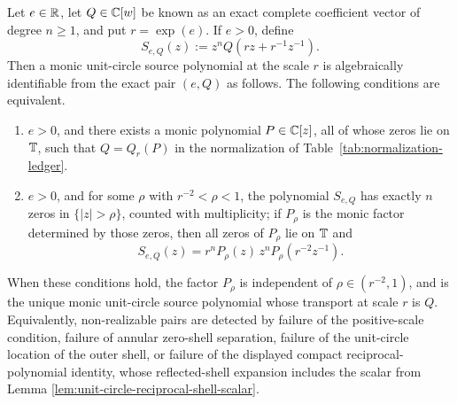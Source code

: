 \begin{theorem}\label{thm:intrinsic-leyang-shell-recognition}
Let \(e\in\mathbb{R}\), let \(Q\in\mathbb{C}[w]\) be known as an exact complete coefficient vector of degree \(n\ge1\), and put \(r=\exp(e)\).  If \(e>0\), define
\[
S_{e,Q}(z):=z^nQ\!\left(rz+r^{-1}z^{-1}\right).
\]
Then a monic unit-circle source polynomial at the scale \(r\) is algebraically identifiable from the exact pair \((e,Q)\) as follows.  The following conditions are equivalent.
\begin{enumerate}[label=\textup{(\roman*)}]
\item \(e>0\), and there exists a monic polynomial \(P\in\mathbb{C}[z]\), all of whose zeros lie on \(\mathbb{T}\), such that \(Q=Q_r(P)\) in the normalization of Table~\ref{tab:normalization-ledger}.
\item \(e>0\), and for some \(\rho\) with \(r^{-2}<\rho<1\), the polynomial \(S_{e,Q}\) has exactly \(n\) zeros in \(\{|z|>\rho\}\), counted with multiplicity; if \(P_\rho\) is the monic factor determined by those zeros, then all zeros of \(P_\rho\) lie on \(\mathbb{T}\) and
\[
\boxed{\;
S_{e,Q}(z)=r^n P_\rho(z)\,z^nP_\rho\!\left(r^{-2}z^{-1}\right).
\;}
\]
\end{enumerate}
When these conditions hold, the factor \(P_\rho\) is independent of \(\rho\in(r^{-2},1)\), and is the unique monic unit-circle source polynomial whose transport at scale \(r\) is \(Q\).  Equivalently, non-realizable pairs are detected by failure of the positive-scale condition, failure of annular zero-shell separation, failure of the unit-circle location of the outer shell, or failure of the displayed compact reciprocal-polynomial identity, whose reflected-shell expansion includes the scalar from Lemma \ref{lem:unit-circle-reciprocal-shell-scalar}.
\end{theorem}

